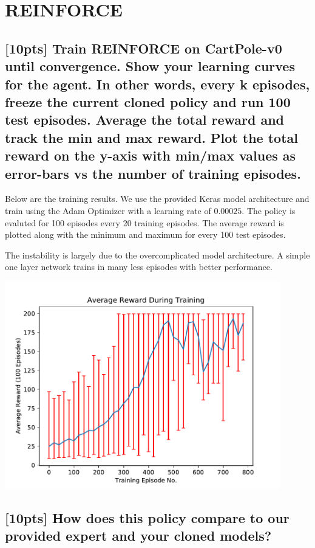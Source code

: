 \documentclass{article}
\begin{document}
\section{REINFORCE}

\subsection{[10pts] Train REINFORCE on CartPole-v0 until convergence. Show your learning curves for the agent. In other words, every k episodes, freeze the current cloned policy and run 100 test episodes. Average the total reward and track the min and max reward. Plot the total reward on the y-axis with min/max values as error-bars vs the number of training episodes.}

Below are the training results. We use the provided Keras model architecture and train using the Adam Optimizer with a learning rate of $0.00025$. The policy is evaluted for 100 episodes every 20 training episodes. The average reward is plotted along with the minimum and maximum for every 100 test episodes.

The instability is largely due to the overcomplicated model architecture. A simple one layer network trains in many less episodes with better performance.
\begin{center}
  \includegraphics[width=12cm]{images/reinforce_plot.pdf}
\end{center}

\subsection{[10pts] How does this policy compare to our provided expert and your cloned models?}
\end{document}
